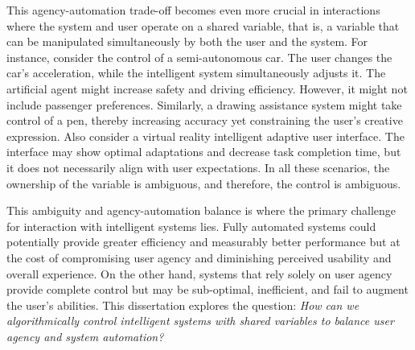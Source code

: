 This agency-automation trade-off becomes even more crucial in interactions where the system and user operate on a shared variable, that is, a variable that can be manipulated simultaneously by both the user and the system. For instance, consider the control of a semi-autonomous car. The user changes the car's acceleration, while the intelligent system simultaneously adjusts it. The artificial agent might increase safety and driving efficiency. However, it might not include passenger preferences. Similarly, a drawing assistance system might take control of a pen, thereby increasing accuracy yet constraining the user's creative expression. Also consider a virtual reality intelligent adaptive user interface. The interface may show optimal adaptations and decrease task completion time, but it does not necessarily align with user expectations. In all these scenarios, the ownership of the variable is ambiguous, and therefore, the control is ambiguous.

This ambiguity and agency-automation balance is where the primary challenge for interaction with intelligent systems lies. Fully automated systems could potentially provide greater efficiency and measurably better performance but at the cost of compromising user agency and diminishing perceived usability and overall experience. On the other hand, systems that rely solely on user agency provide complete control but may be sub-optimal, inefficient, and fail to augment the user's abilities. This dissertation explores the question: \emph{How can we algorithmically control intelligent systems with shared variables to balance user agency and system automation?}

